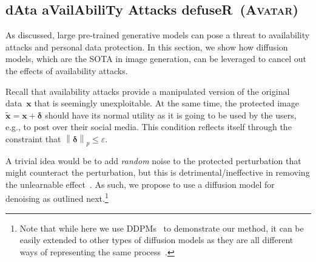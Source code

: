 \documentclass[conference]{IEEEtran}
\theoremstyle{definition}
\theoremstyle{remark}
\theoremstyle{proposition}
\newcommand{\norm}[1]{\left\lVert#1\right\rVert}
\begin{document}
\subsection{dAta aVailAbiliTy Attacks defuseR~(\textsc{Avatar})}\label{sec:avatar}
As discussed, large pre-trained generative models can pose a threat to availability attacks and personal data protection.
In this section, we show how diffusion models, which are the SOTA in image generation, can be leveraged to cancel out the effects of availability attacks.

Recall that availability attacks provide a manipulated version of the original data~$\boldsymbol{x}$ that is seemingly unexploitable.
At the same time, the protected image~$\tilde{\boldsymbol{x}} = \boldsymbol{x} + \boldsymbol{\delta}$ should have its normal utility as it is going to be used by the users, e.g., to post over their social media.
This condition reflects itself through the constraint that $\norm{\boldsymbol{\delta}}_{p} \leq \varepsilon$.

A trivial idea would be to add \textit{random} noise to the protected perturbation that might counteract the perturbation, but this is detrimental/ineffective in removing the unlearnable effect~\citep{huang2021emn}.
As such, we propose to use a diffusion model for denoising as outlined next.\footnote{Note that while here we use DDPMs~\citep{ho2020ddpm} to demonstrate our method, it can be easily extended to other types of diffusion models as they are all different ways of representing the same process~\citep{song2021scoresde}.}
\end{document}
